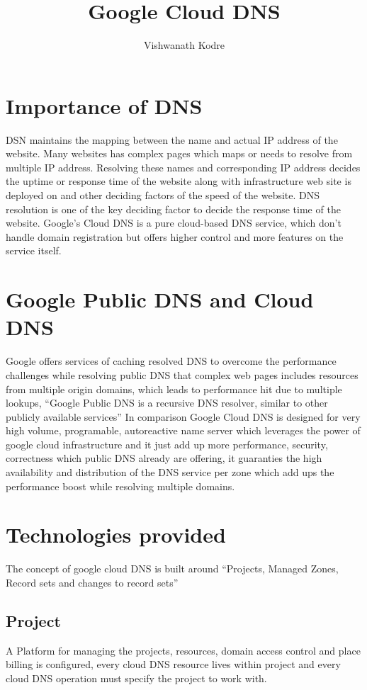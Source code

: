 \documentclass[9pt,twocolumn,twoside]{styles/osajnl}
\title{Google Cloud DNS}
\author[1,*]{Vishwanath Kodre}
\affil[1]{School of Informatics and Computing, Bloomington, IN 47408, U.S.A.}
\affil[*]{Corresponding authors: vkodre@iu.edu}
\begin{document}
\maketitle
\section{Importance of DNS}
DSN maintains the mapping between the name and actual IP address of the website. Many websites has complex pages which maps or needs to resolve from multiple IP address. Resolving these names and corresponding IP address decides the uptime or response time of the website along with infrastructure web site is deployed on and other deciding factors of the speed of the website. DNS resolution is one of the key deciding factor to decide the response time of the website. 
Google’s Cloud DNS is a pure cloud-based DNS service, which don’t handle domain registration but offers higher control and more features on the service itself.

\section{Google Public DNS and Cloud DNS}
Google offers services of caching resolved DNS to overcome the performance challenges while resolving public DNS that complex web pages includes resources from multiple origin domains, which leads to performance hit due to multiple lookups, “Google Public DNS is a recursive DNS resolver, similar to other publicly available services”\cite{public-dns}
In comparison Google Cloud DNS is designed for very high volume, programable, autoreactive name server which leverages the power of google cloud infrastructure and it just add up more performance, security, correctness which public DNS already are offering, it guaranties the high availability and distribution of the DNS service per zone which add ups the performance boost while resolving multiple domains.

\section{Technologies provided}
The concept of google cloud DNS is built around “Projects, Managed Zones, Record sets and changes to record sets”\cite{dns-overview}
\subsection{Project}
A Platform for managing the projects, resources, domain access control and place billing is configured, every cloud DNS resource lives within project and every cloud DNS operation must specify the project to work with.
\end{document}

